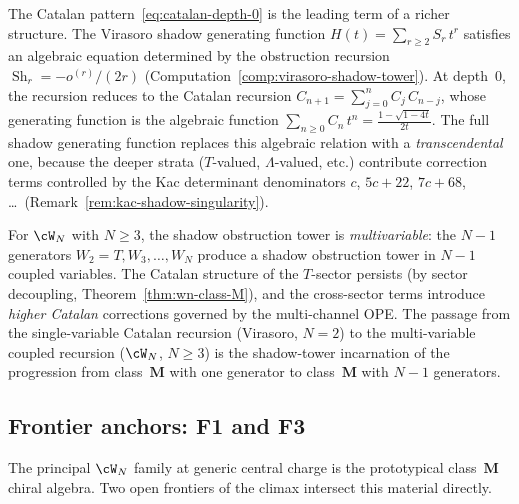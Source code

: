 \begin{remark}%
\label{rem:catalan-to-shadow}%
%
The Catalan pattern~\eqref{eq:catalan-depth-0} is the leading
term of a richer structure. The Virasoro shadow generating
function
$H(t) = \sum_{r \ge 2} S_r\, t^r$
satisfies an algebraic equation determined by the obstruction
recursion $\operatorname{Sh}_r = -o^{(r)}/(2r)$
(Computation~\ref{comp:virasoro-shadow-tower}).
At depth~$0$, the recursion reduces to the Catalan recursion
$C_{n+1} = \sum_{j=0}^n C_j\,C_{n-j}$,
whose generating function is the algebraic function
$\sum_{n \ge 0} C_n\,t^n = \frac{1 - \sqrt{1 - 4t}}{2t}$.
The full shadow generating function replaces this algebraic
relation with a \emph{transcendental} one, because the
deeper strata ($T$-valued, $\Lambda$-valued, etc.)
contribute correction terms controlled by the Kac determinant
denominators $c$, $5c + 22$, $7c + 68$, \ldots\
(Remark~\ref{rem:kac-shadow-singularity}).

For $\cW_N$ with $N \ge 3$, the shadow obstruction tower is
\emph{multivariable}: the $N - 1$ generators $W_2 = T,
W_3, \ldots, W_N$ produce a shadow obstruction tower in $N - 1$
coupled variables. The Catalan structure of the
$T$-sector persists (by sector decoupling,
Theorem~\ref{thm:wn-class-M}), and the cross-sector
terms introduce \emph{higher Catalan} corrections
governed by the multi-channel OPE. The passage from the
single-variable Catalan recursion (Virasoro, $N = 2$) to
the multi-variable coupled recursion ($\cW_N$, $N \ge 3$)
is the shadow-tower incarnation of the progression from
class~$\mathbf{M}$ with one generator to class~$\mathbf{M}$
with $N - 1$ generators.
\end{remark}

\subsection{Frontier anchors: F1 and F3}
\label{subsec:wn-frontier-anchors-f1-f3}

The principal $\cW_N$ family at generic central charge is the
prototypical class~$\mathbf{M}$ chiral algebra. Two open frontiers
of the climax intersect this material directly.

